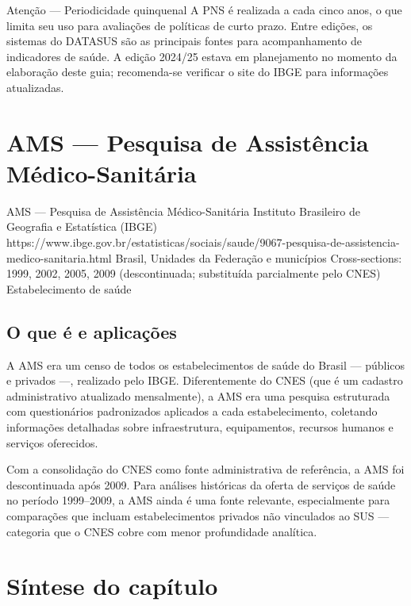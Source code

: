 \begin{boxatencao}{Atenção --- Periodicidade quinquenal}
A PNS é realizada a cada cinco anos, o que limita seu uso para avaliações de políticas de curto prazo. Entre edições, os sistemas do DATASUS são as principais fontes para acompanhamento de indicadores de saúde. A edição 2024/25 estava em planejamento no momento da elaboração deste guia; recomenda-se verificar o site do IBGE para informações atualizadas.
\end{boxatencao}

\section{AMS --- Pesquisa de Assistência Médico-Sanitária}

\ficharapida
  {AMS --- Pesquisa de Assistência Médico-Sanitária}
  {Instituto Brasileiro de Geografia e Estatística (IBGE)}
  {https://www.ibge.gov.br/estatisticas/sociais/saude/9067-pesquisa-de-assistencia-medico-sanitaria.html}
  {Brasil, Unidades da Federação e municípios}
  {Cross-sections: 1999, 2002, 2005, 2009 (descontinuada; substituída parcialmente pelo CNES)}
  {Estabelecimento de saúde}

\subsection{O que é e aplicações}

A AMS era um censo de todos os estabelecimentos de saúde do Brasil --- públicos e privados ---, realizado pelo IBGE. Diferentemente do CNES (que é um cadastro administrativo atualizado mensalmente), a AMS era uma pesquisa estruturada com questionários padronizados aplicados a cada estabelecimento, coletando informações detalhadas sobre infraestrutura, equipamentos, recursos humanos e serviços oferecidos.

Com a consolidação do CNES como fonte administrativa de referência, a AMS foi descontinuada após 2009. Para análises históricas da oferta de serviços de saúde no período 1999--2009, a AMS ainda é uma fonte relevante, especialmente para comparações que incluam estabelecimentos privados não vinculados ao SUS --- categoria que o CNES cobre com menor profundidade analítica.

\section{Síntese do capítulo}

